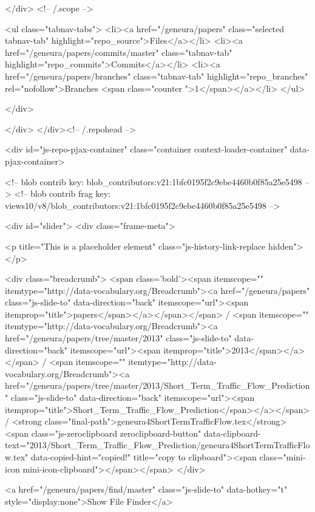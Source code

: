   </div> <!-- /.scope -->

  <ul class="tabnav-tabs">
    <li><a href="/geneura/papers" class="selected tabnav-tab" highlight="repo_source">Files</a></li>
    <li><a href="/geneura/papers/commits/master" class="tabnav-tab" highlight="repo_commits">Commits</a></li>
    <li><a href="/geneura/papers/branches" class="tabnav-tab" highlight="repo_branches" rel="nofollow">Branches <span class="counter ">1</span></a></li>
  </ul>

</div>

  
  
  


            
          </div>
        </div><!-- /.repohead -->

        <div id="js-repo-pjax-container" class="container context-loader-container" data-pjax-container>
          


<!-- blob contrib key: blob_contributors:v21:1bfc0195f2c9ebe4460b0f85a25e5498 -->
<!-- blob contrib frag key: views10/v8/blob_contributors:v21:1bfc0195f2c9ebe4460b0f85a25e5498 -->


<div id="slider">
    <div class="frame-meta">

      <p title="This is a placeholder element" class="js-history-link-replace hidden"></p>

        <div class="breadcrumb">
          <span class='bold'><span itemscope="" itemtype="http://data-vocabulary.org/Breadcrumb"><a href="/geneura/papers" class="js-slide-to" data-direction="back" itemscope="url"><span itemprop="title">papers</span></a></span></span> / <span itemscope="" itemtype="http://data-vocabulary.org/Breadcrumb"><a href="/geneura/papers/tree/master/2013" class="js-slide-to" data-direction="back" itemscope="url"><span itemprop="title">2013</span></a></span> / <span itemscope="" itemtype="http://data-vocabulary.org/Breadcrumb"><a href="/geneura/papers/tree/master/2013/Short_Term_Traffic_Flow_Prediction" class="js-slide-to" data-direction="back" itemscope="url"><span itemprop="title">Short_Term_Traffic_Flow_Prediction</span></a></span> / <strong class="final-path">geneura4ShortTermTrafficFlow.tex</strong> <span class="js-zeroclipboard zeroclipboard-button" data-clipboard-text="2013/Short_Term_Traffic_Flow_Prediction/geneura4ShortTermTrafficFlow.tex" data-copied-hint="copied!" title="copy to clipboard"><span class="mini-icon mini-icon-clipboard"></span></span>
        </div>

      <a href="/geneura/papers/find/master" class="js-slide-to" data-hotkey="t" style="display:none">Show File Finder</a>


